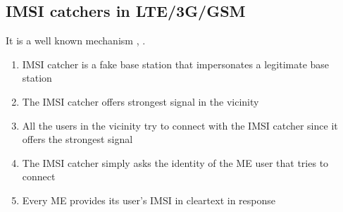 \documentclass[portrait,a0]{a0poster}
\begin{document}
\begin{multicols}{2}
\section{IMSI catchers in LTE/3G/GSM}
It is a well known mechanism \citep{Ginzboorg_Niemi_2016}, \citep{ravi}.
\begin{enumerate}
\item IMSI catcher is a fake base station that impersonates a legitimate base station
\item The IMSI catcher offers strongest signal in the vicinity
\item All the users in the vicinity try to connect with the IMSI catcher since it offers the strongest signal
\item The IMSI catcher simply asks the identity of the ME user that tries to connect 
\item Every ME provides its user's IMSI in cleartext in response
\end{enumerate}



\end{multicols}
\end{document}

